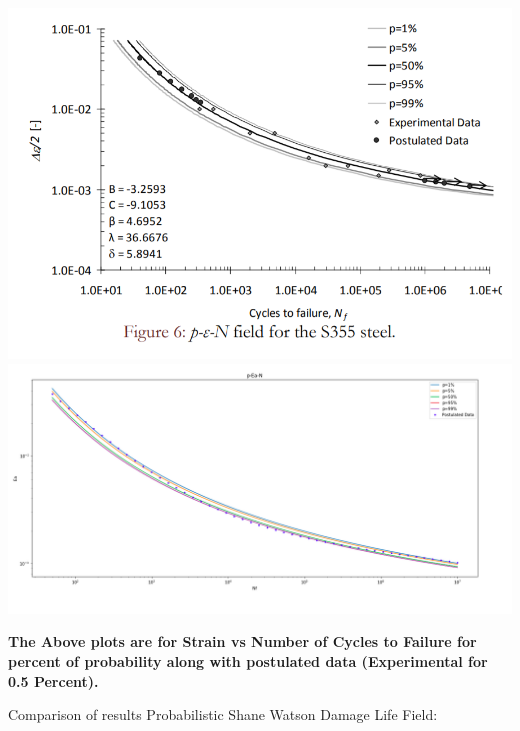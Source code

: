 \documentclass[11pt]{article}
\begin{document}
\includegraphics{images/p_e_n_paper.PNG}
\includegraphics{images/p_e_n_model.PNG}

\textbf{The Above plots are for Strain vs Number of Cycles to Failure
for percent of probability along with postulated data (Experimental for
0.5 Percent).}

Comparison of results Probabilistic Shane Watson Damage Life Field:
\end{document}
